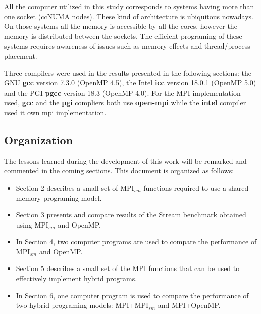 All the computer utilized in this study corresponds to systems having more than one socket (ccNUMA nodes). These kind of architecture is ubiquitous nowadays. On those systems all the memory is accessible by all the cores, however the memory is distributed between the sockets. The efficient programing of these systems requires awareness of issues such as memory effects and thread/process placement.


Three compilers were used in the results presented in the following sections: the GNU \textbf{gcc}  version 7.3.0 (OpenMP 4.5), the Intel \textbf{icc} version 18.0.1 (OpenMP 5.0) and the  PGI \textbf{pgcc} version 18.3 (OpenMP 4.0). For the MPI implementation used, \textbf{gcc} and the \textbf{pgi} compliers both use \textbf{open-mpi} while the \textbf{intel} compiler used it own mpi implementation.



\subsection*{Organization}


\medskip

The lessons learned during the development of this work will be remarked and commented in the coming sections. This document is organized as follows:

\begin{itemize} 
\item Section 2 describes a small set of MPI$_{sm}$ functions required to use a shared memory programing model. %

\item Section 3 presents and compare results of the Stream benchmark obtained using MPI$_{sm}$ and OpenMP.

\item In Section 4, two computer programs are used to compare the performance of MPI$_{sm}$ and OpenMP.

\item Section 5 describes a small set of the MPI functions that can be used to effectively implement hybrid programs.

\item In Section 6, one computer program is used to compare the performance of two hybrid programing models: MPI+MPI$_{sm}$ and MPI+OpenMP.


\end{itemize}






